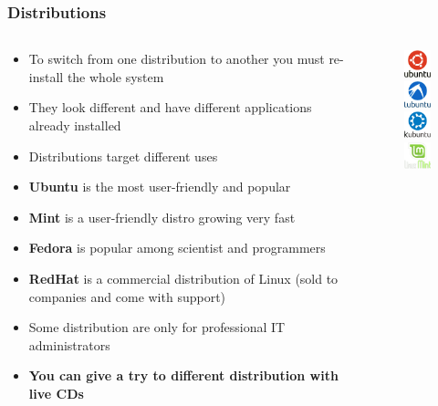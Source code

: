 \documentclass{beamer}
\begin{document}
\begin{frame}
\frametitle{Distributions}
\begin{columns}
\begin{column}{10cm}
\begin{itemize}
\item To switch from one distribution to another you must re-install the whole system
\item They look different and have different applications already installed
\item Distributions target different uses
\item \textbf{Ubuntu} is the most user-friendly and popular
\item \textbf{Mint} is a user-friendly distro growing very fast
\item \textbf{Fedora} is popular among scientist and programmers
\item \textbf{RedHat} is a commercial distribution of Linux (sold to companies and come with support)
\item Some distribution are only for professional IT administrators
\item \textbf{You can give a try to different distribution with live CDs}
\end{itemize}
\end{column}
\begin{column}{1cm}
\begin{figure}
\includegraphics[scale=0.2]{ubuntu.png}\\%
\includegraphics[scale=0.2]{lubuntu.png}\\%
\includegraphics[scale=0.2]{kubuntu.png}\\
\includegraphics[scale=0.2]{mint.png}\\%

\end{figure}
\end{column}
\end{columns}
\end{frame}
\end{document}
